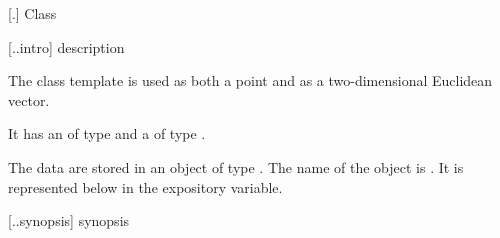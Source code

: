  [\iotwod.\pointtwod] {Class }

 [\iotwod.\pointtwod.intro] { description}

%
\pnum
The class template  is used as both a point and as a two-dimensional Euclidean vector.

\pnum
It has an  of type  and a  of type .

\pnum
The data are stored in an object of type . The name of the object is \unspec. It is represented below in the expository  variable.

 [\iotwod.\pointtwod.synopsis] { synopsis}

